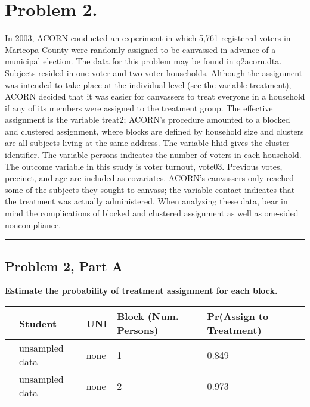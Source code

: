 \documentclass[11pt,notitlepage]{article}
\begin{document}
\section{Problem 2.}  In 2003, ACORN conducted an experiment in which 5,761 registered voters in Maricopa County were randomly assigned to be canvassed in advance of a municipal election.  The data for this problem may be found in q2acorn.dta. Subjects resided in one-voter and two-voter households.  Although the assignment was intended to take place at the individual level (see the variable treatment), ACORN decided that it was easier for canvassers to treat everyone in a household if any of its members were assigned to the treatment group.  The effective assignment is the variable treat2; ACORN's procedure amounted to a blocked and clustered assignment, where blocks are defined by household size and clusters are all subjects living at the same address.  The variable hhid gives the cluster identifier.  The variable persons indicates the number of voters in each household.  The outcome variable in this study is voter turnout, vote03.  Previous votes, precinct, and age are included as covariates. ACORN's canvassers only reached some of the subjects they sought to canvass; the variable contact indicates that the treatment was actually administered.  When analyzing these data, bear in mind the complications of blocked and clustered assignment as well as one-sided noncompliance.


\vspace{.5cm}
\hrule
\vspace{.5cm}

\subsection{Problem 2, Part A} {\bf Estimate the probability of treatment assignment for each block.}

\vspace{1cm}

\begin{table}[ht]
\begin{center}
\begin{tabular}{rllll}
  \hline
 & Student & UNI & Block (Num. Persons) & Pr(Assign to Treatment) \\ 
  \hline
 & unsampled data & none & 1 & 0.849 \\ 
 & unsampled data & none & 2 & 0.973 \\ 
   \hline
\end{tabular}
\end{center}
\end{table}
\end{document}
